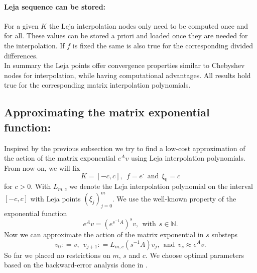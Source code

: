 \documentclass{scrartcl}
\newcommand{\defneq}{\mathrel{\mathop:}=}
\begin{document}
\paragraph{Leja sequence can be stored:}
For a given $K$ the Leja interpolation nodes only need to be computed once and for all. These values can be stored a priori and loaded once they are needed for the interpolation. If $f$ is fixed the same is also true for the corresponding divided differences. \\

In summary the Leja points offer convergence properties similar to Chebyshev nodes for interpolation, while having computational advantages. All results hold true for the corresponding matrix interpolation polynomials.

\subsection{Approximating the matrix exponential function:}
Inspired by the previous subsection we try to find a low-cost approximation of the action of the matrix exponential $e^Av$ using Leja interpolation polynomials. From now on, we will fix 
\[K=[-c,c], ~~ f = e^\cdot  ~~\text{and}~~ \xi_0 = c \]
for $c>0$. With $L_{m,c}$ we denote the Leja interpolation polynomial on the interval $[-c,c]$ with Leja points $(\xi_j)_{j=0}^{m}$. We use the well-known property of the exponential function
\[e^Av = (e^{s^{-1}A})^sv, ~~\text{with}~~ s\in\mathbb{N}.\]
Now we can approximate the action of the matrix exponential in $s$ substeps
\[v_0\defneq v, ~~ v_{j+1}\defneq L_{m,c}(s^{-1}A)v_j, ~~\text{and}~~ v_s \approx e^Av.\]
So far we placed no restrictions on $m$, $s$ and $c$. We choose optimal parameters based on the backward-error analysis done in \cite{lejarev}.
\end{document}
